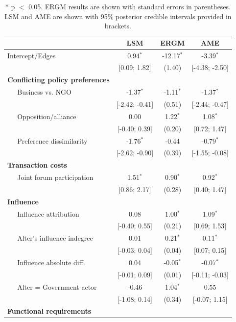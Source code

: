 \documentclass[9pt,twocolumn,twoside,lineno]{pnas-new}
\begin{document}
\begin{table}[ht]
\centering
\caption{* p $<$ 0.05. ERGM results are shown with standard errors in parentheses. LSM and AME are shown with 95\% posterior credible intervals provided in brackets.}
\begin{tabular}{lccc}
  & LSM & ERGM & AME \\
  \hline
\hline
Intercept/Edges & 0.94$^{\ast}$ & -12.17$^{\ast}$ & -3.39$^{\ast}$ \\
   & [0.09; 1.82] & (1.40) & [-4.38; -2.50] \\
  \textbf{Conflicting policy preferences}  &  &  &  \\
  $\;\;\;\;$ Business vs. NGO & -1.37$^{\ast}$ & -1.11$^{\ast}$ & -1.37$^{\ast}$ \\
   & [-2.42; -0.41] & (0.51) & [-2.44; -0.47] \\
  $\;\;\;\;$ Opposition/alliance  & 0.00 & 1.22$^{\ast}$ & 1.08$^{\ast}$ \\
   & [-0.40; 0.39] & (0.20) & [0.72; 1.47] \\
  $\;\;\;\;$ Preference dissimilarity & -1.76$^{\ast}$ & -0.44 & -0.79$^{\ast}$ \\
   & [-2.62; -0.90] & (0.39) & [-1.55; -0.08] \\
  \textbf{Transaction costs}  &  &  &  \\
  $\;\;\;\;$ Joint forum participation & 1.51$^{\ast}$ & 0.90$^{\ast}$ & 0.92$^{\ast}$ \\
   & [0.86; 2.17] & (0.28) & [0.40; 1.47] \\
  \textbf{Influence}  &  &  &  \\
  $\;\;\;\;$ Influence attribution & 0.08 & 1.00$^{\ast}$ & 1.09$^{\ast}$ \\
   & [-0.40; 0.55] & (0.21) & [0.69; 1.53] \\
  $\;\;\;\;$ Alter's influence indegree & 0.01 & 0.21$^{\ast}$ & 0.11$^{\ast}$ \\
   & [-0.03; 0.04] & (0.04) & [0.07; 0.15] \\
  $\;\;\;\;$ Influence absolute diff. & 0.04 & -0.05$^{\ast}$ & -0.07$^{\ast}$ \\
   & [-0.01; 0.09] & (0.01) & [-0.11; -0.03] \\
  $\;\;\;\;$ Alter = Government actor & -0.46 & 1.04$^{\ast}$ & 0.55 \\
   & [-1.08; 0.14] & (0.34) & [-0.07; 1.15] \\
  \textbf{Functional requirements}  &  &  &  \\

\end{tabular}
\end{table}
\end{document}
